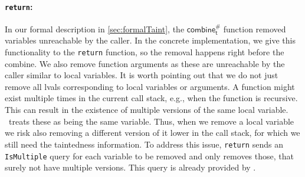           \paragraph{\texttt{return}:} In our formal description in \autoref{sec:formalTaint}, the $\textsf{combine}^{\#}_\textsf{t}$ function removed variables unreachable by the caller. In the concrete implementation, we give this functionality to the \texttt{return} function, so the removal happens right before the combine. We also remove function arguments as these are unreachable by the caller similar to local variables.
          It is worth pointing out that we do not just remove all \ac{lval}s corresponding to local variables or arguments. A function might exist multiple times in the current call stack, e.g., when the function is recursive. This can result in the existence of multiple versions of the same local variable. \gob\ treats these as being the same variable. Thus, when we remove a local variable we risk also removing a different version of it lower in the call stack, for which we still need the taintedness information. To address this issue, \texttt{return} sends an \texttt{IsMultiple} query for each variable to be removed and only removes those, that surely not have multiple versions. This query is already provided by \gob.

